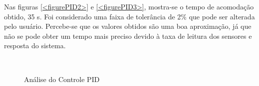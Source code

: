 \documentclass[a4paper,12pt]{article}
\begin{document}
\hspace{4ex}Nas figuras \ref{<figurePID2>} e \ref{<figurePID3>}, mostra-se o tempo de acomodação obtido, 35 s. Foi considerado uma faixa de tolerância de 2\% que pode ser alterada pelo usuário. Percebe-se que os valores obtidos são uma boa aproximação, já que não se pode obter um tempo mais preciso devido à taxa de leitura dos sensores e resposta do sistema.
\begin{figure}[H]
     \centering
     \hspace{4ex}
     \\
     
     \caption{Análise do Controle PID}
     \label{controlePID}
\end{figure}
\end{document}
